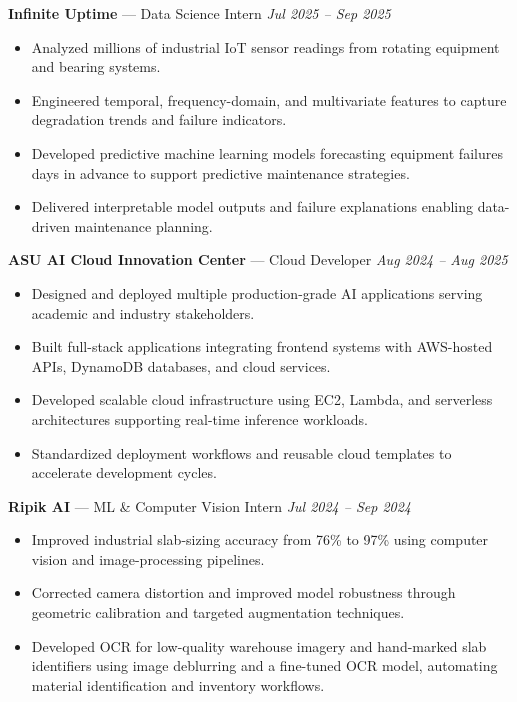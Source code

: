 \documentclass[a4paper,8pt]{extarticle}
\begin{document}
\noindent
\textbf{Infinite Uptime} --- Data Science Intern
\hfill \textit{Jul 2025 -- Sep 2025}

\begin{itemize}
\item Analyzed millions of industrial IoT sensor readings from rotating equipment and bearing systems.
\item Engineered temporal, frequency-domain, and multivariate features to capture degradation trends and failure indicators.
\item Developed predictive machine learning models forecasting equipment failures days in advance to support predictive maintenance strategies.
\item Delivered interpretable model outputs and failure explanations enabling data-driven maintenance planning.
\end{itemize}

\noindent
\textbf{ASU AI Cloud Innovation Center} --- Cloud Developer
\hfill \textit{Aug 2024 -- Aug 2025}

\begin{itemize}
\item Designed and deployed multiple production-grade AI applications serving academic and industry stakeholders.
\item Built full-stack applications integrating frontend systems with AWS-hosted APIs, DynamoDB databases, and cloud services.
\item Developed scalable cloud infrastructure using EC2, Lambda, and serverless architectures supporting real-time inference workloads.
\item Standardized deployment workflows and reusable cloud templates to accelerate development cycles.
\end{itemize}

\noindent
\textbf{Ripik AI} --- ML \& Computer Vision Intern
\hfill \textit{Jul 2024 -- Sep 2024}

\begin{itemize}
\item Improved industrial slab-sizing accuracy from 76\% to 97\% using computer vision and image-processing pipelines.
\item Corrected camera distortion and improved model robustness through geometric calibration and targeted augmentation techniques.
\item Developed OCR for low-quality warehouse imagery and hand-marked slab identifiers using image deblurring and a fine-tuned OCR model, automating material identification and inventory workflows.
\end{itemize}
\end{document}
